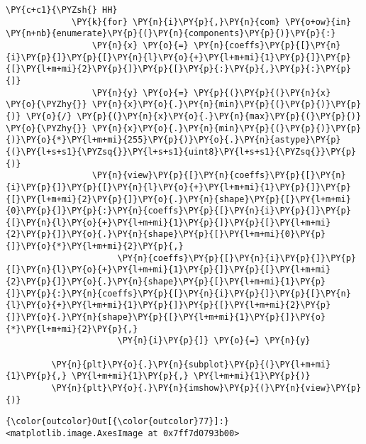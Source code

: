 \begin{Verbatim}[commandchars=\\\{\}]
             \PY{c+c1}{\PYZsh{} HH}
             \PY{k}{for} \PY{n}{i}\PY{p}{,}\PY{n}{com} \PY{o+ow}{in} \PY{n+nb}{enumerate}\PY{p}{(}\PY{n}{components}\PY{p}{)}\PY{p}{:}
                 \PY{n}{x} \PY{o}{=} \PY{n}{coeffs}\PY{p}{[}\PY{n}{i}\PY{p}{]}\PY{p}{[}\PY{n}{l}\PY{o}{+}\PY{l+m+mi}{1}\PY{p}{]}\PY{p}{[}\PY{l+m+mi}{2}\PY{p}{]}\PY{p}{[}\PY{p}{:}\PY{p}{,}\PY{p}{:}\PY{p}{]}
                 \PY{n}{y} \PY{o}{=} \PY{p}{(}\PY{p}{(}\PY{n}{x} \PY{o}{\PYZhy{}} \PY{n}{x}\PY{o}{.}\PY{n}{min}\PY{p}{(}\PY{p}{)}\PY{p}{)} \PY{o}{/} \PY{p}{(}\PY{n}{x}\PY{o}{.}\PY{n}{max}\PY{p}{(}\PY{p}{)} \PY{o}{\PYZhy{}} \PY{n}{x}\PY{o}{.}\PY{n}{min}\PY{p}{(}\PY{p}{)}\PY{p}{)}\PY{o}{*}\PY{l+m+mi}{255}\PY{p}{)}\PY{o}{.}\PY{n}{astype}\PY{p}{(}\PY{l+s+s1}{\PYZsq{}}\PY{l+s+s1}{uint8}\PY{l+s+s1}{\PYZsq{}}\PY{p}{)}
                 \PY{n}{view}\PY{p}{[}\PY{n}{coeffs}\PY{p}{[}\PY{n}{i}\PY{p}{]}\PY{p}{[}\PY{n}{l}\PY{o}{+}\PY{l+m+mi}{1}\PY{p}{]}\PY{p}{[}\PY{l+m+mi}{2}\PY{p}{]}\PY{o}{.}\PY{n}{shape}\PY{p}{[}\PY{l+m+mi}{0}\PY{p}{]}\PY{p}{:}\PY{n}{coeffs}\PY{p}{[}\PY{n}{i}\PY{p}{]}\PY{p}{[}\PY{n}{l}\PY{o}{+}\PY{l+m+mi}{1}\PY{p}{]}\PY{p}{[}\PY{l+m+mi}{2}\PY{p}{]}\PY{o}{.}\PY{n}{shape}\PY{p}{[}\PY{l+m+mi}{0}\PY{p}{]}\PY{o}{*}\PY{l+m+mi}{2}\PY{p}{,}
                      \PY{n}{coeffs}\PY{p}{[}\PY{n}{i}\PY{p}{]}\PY{p}{[}\PY{n}{l}\PY{o}{+}\PY{l+m+mi}{1}\PY{p}{]}\PY{p}{[}\PY{l+m+mi}{2}\PY{p}{]}\PY{o}{.}\PY{n}{shape}\PY{p}{[}\PY{l+m+mi}{1}\PY{p}{]}\PY{p}{:}\PY{n}{coeffs}\PY{p}{[}\PY{n}{i}\PY{p}{]}\PY{p}{[}\PY{n}{l}\PY{o}{+}\PY{l+m+mi}{1}\PY{p}{]}\PY{p}{[}\PY{l+m+mi}{2}\PY{p}{]}\PY{o}{.}\PY{n}{shape}\PY{p}{[}\PY{l+m+mi}{1}\PY{p}{]}\PY{o}{*}\PY{l+m+mi}{2}\PY{p}{,}
                      \PY{n}{i}\PY{p}{]} \PY{o}{=} \PY{n}{y}
         
         \PY{n}{plt}\PY{o}{.}\PY{n}{subplot}\PY{p}{(}\PY{l+m+mi}{1}\PY{p}{,} \PY{l+m+mi}{1}\PY{p}{,} \PY{l+m+mi}{1}\PY{p}{)}
         \PY{n}{plt}\PY{o}{.}\PY{n}{imshow}\PY{p}{(}\PY{n}{view}\PY{p}{)}
\end{Verbatim}


\begin{Verbatim}[commandchars=\\\{\}]
{\color{outcolor}Out[{\color{outcolor}77}]:} <matplotlib.image.AxesImage at 0x7ff7d0793b00>
\end{Verbatim}
            
    \begin{center}
    \end{center}
    { \hspace*{\fill} \\}
    
